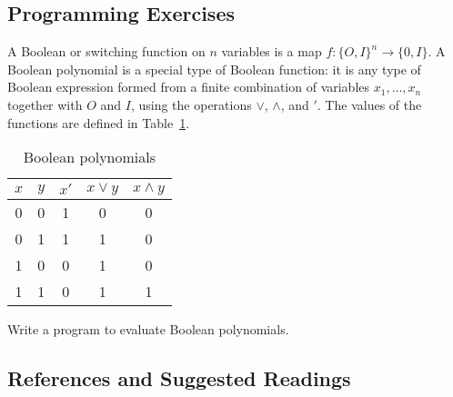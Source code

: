  
\subsection*{Programming Exercises}
 
{\small
 
 
A {\bfi Boolean\/} or
{\bfi switching function on $n$ variables\/} is a map $f : \{O, I\}^n
\rightarrow \{ 0, I\}$. A Boolean polynomial is a special type of
Boolean function: it is any type of Boolean expression formed from a
finite combination of variables $x_1, \ldots, x_n$ together with $O$
and $I$, using the operations $\vee$, $\wedge$, and $'$. The values of
the functions are defined in Table~\ref{BooleanPoly}. 
\begin{table} 
\caption{Boolean polynomials}{\small
\label{BooleanPoly}
\begin{center}
\begin{tabular}{|cc|ccc|}
\hline
$x$ & $y$ & $x'$ & $x \vee y$ & $x \wedge y$ \\ \hline
0   & 0   & 1    & 0          & 0            \\
0   & 1   & 1    & 1          & 0            \\
1   & 0   & 0    & 1          & 0            \\
1   & 1   & 0    & 1          & 1            \\
\hline
\end{tabular}
\end{center}
}
\end{table}
Write a program to evaluate Boolean polynomials.  
}
 
 
 
\subsection*{References and Suggested Readings}
 
